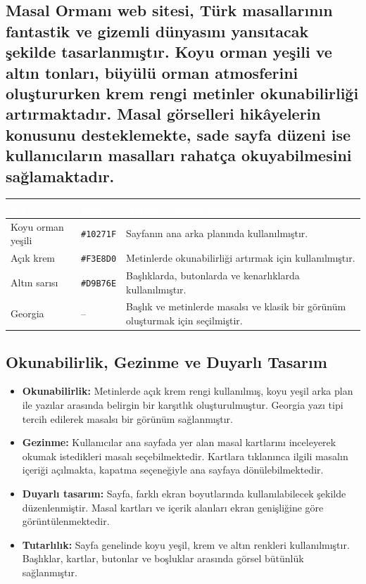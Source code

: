 \documentclass[12pt,a4paper]{article}
\begin{document}
\subsection{Masal Ormanı web sitesi, Türk masallarının fantastik ve gizemli dünyasını yansıtacak şekilde tasarlanmıştır. Koyu orman yeşili ve altın tonları, büyülü orman atmosferini oluştururken krem rengi metinler okunabilirliği artırmaktadır. Masal görselleri hikâyelerin konusunu desteklemekte, sade sayfa düzeni ise kullanıcıların masalları rahatça okuyabilmesini sağlamaktadır.}
\begin{center}
\begin{tabular}{@{}llp{6.4cm}@{}}
\toprule
\rowcolor{ana}\textcolor{white}{\textbf{Ad}} & \textcolor{white}{\textbf{Kod}} & \textcolor{white}{\textbf{Nerede / neden kullandınız?}} \\
\midrule
Koyu orman yeşili & \texttt{\#10271F} & Sayfanın ana arka planında kullanılmıştır. \\
Açık krem & \texttt{\#F3E8D0} & Metinlerde okunabilirliği artırmak için kullanılmıştır. \\
Altın sarısı & \texttt{\#D9B76E} & Başlıklarda, butonlarda ve kenarlıklarda kullanılmıştır. \\
Georgia & -- & Başlık ve metinlerde masalsı ve klasik bir görünüm oluşturmak için seçilmiştir. \\
\bottomrule
\end{tabular}
\end{center}

\subsection{Okunabilirlik, Gezinme ve Duyarlı Tasarım}
\begin{itemize}
  \item \textbf{Okunabilirlik:} Metinlerde açık krem rengi kullanılmış, koyu yeşil arka plan ile yazılar arasında belirgin bir karşıtlık oluşturulmuştur. Georgia yazı tipi tercih edilerek masalsı bir görünüm sağlanmıştır.

  \item \textbf{Gezinme:} Kullanıcılar ana sayfada yer alan masal kartlarını inceleyerek okumak istedikleri masalı seçebilmektedir. Kartlara tıklanınca ilgili masalın içeriği açılmakta, kapatma seçeneğiyle ana sayfaya dönülebilmektedir.

  \item \textbf{Duyarlı tasarım:} Sayfa, farklı ekran boyutlarında kullanılabilecek şekilde düzenlenmiştir. Masal kartları ve içerik alanları ekran genişliğine göre görüntülenmektedir.

  \item \textbf{Tutarlılık:} Sayfa genelinde koyu yeşil, krem ve altın renkleri kullanılmıştır. Başlıklar, kartlar, butonlar ve boşluklar arasında görsel bütünlük sağlanmıştır.
\end{itemize}
\end{document}
